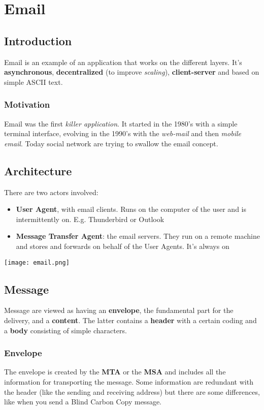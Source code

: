 \newpage
\section{Email}
\subsection{Introduction}
Email is an example of an application that works on the different layers. It's \textbf{asynchronous}, \textbf{decentralized} (to improve \textit{scaling}), \textbf{client-server} and based on simple ASCII text.
\subsubsection{Motivation}
Email was the first \textit{killer application}. It started in the 1980's with a simple terminal interface, evolving in the 1990's with the \textit{web-mail} and then \textit{mobile email}. Today social network are trying to swallow the email concept.
\subsection{Architecture}
There are two actors involved:
\begin{itemize}
	\item \textbf{User Agent}, with email clients. Runs on the computer of the user and is intermittently on. E.g. Thunderbird or Outlook
	\item \textbf{Message Transfer Agent}: the email servers. They run on a remote machine and stores and forwards on behalf of the User Agents. It's always on
\end{itemize}

\begin{center}
	\texttt{[image: email.png]}
\end{center}

\subsection{Message}
Message are viewed as having an \textbf{envelope}, the fundamental part for the delivery, and a \textbf{content}. The latter contains a \textbf{header} with a certain coding and a \textbf{body} consisting of simple characters.

\subsubsection{Envelope}
The envelope is created by the \textbf{MTA} or the \textbf{MSA} and includes all the information for transporting the message. Some information are redundant with the header (like the sending and receiving address) but there are some differences, like when you send a Blind Carbon Copy message.

